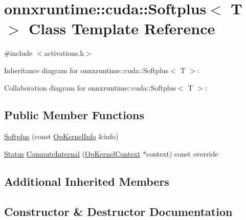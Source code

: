 \hypertarget{classonnxruntime_1_1cuda_1_1Softplus}{}\section{onnxruntime\+:\+:cuda\+:\+:Softplus$<$ T $>$ Class Template Reference}
\label{classonnxruntime_1_1cuda_1_1Softplus}


{\ttfamily \#include $<$activations.\+h$>$}



Inheritance diagram for onnxruntime\+:\+:cuda\+:\+:Softplus$<$ T $>$\+:


Collaboration diagram for onnxruntime\+:\+:cuda\+:\+:Softplus$<$ T $>$\+:
\subsection*{Public Member Functions}
\begin{DoxyCompactItemize}
\item 
\mbox{\hyperlink{classonnxruntime_1_1cuda_1_1Softplus_a73c8ec5cdf027ed7f70bb072b58ab3ea}{Softplus}} (const \mbox{\hyperlink{classonnxruntime_1_1OpKernelInfo}{Op\+Kernel\+Info}} \&info)
\item 
\mbox{\hyperlink{classonnxruntime_1_1common_1_1Status}{Status}} \mbox{\hyperlink{classonnxruntime_1_1cuda_1_1Softplus_a3ad8048f5c23f4edb87db9f86e419db8}{Compute\+Internal}} (\mbox{\hyperlink{classonnxruntime_1_1OpKernelContext}{Op\+Kernel\+Context}} $\ast$context) const override
\end{DoxyCompactItemize}
\subsection*{Additional Inherited Members}


\subsection{Constructor \& Destructor Documentation}
\mbox{\label{classonnxruntime_1_1cuda_1_1Softplus_a73c8ec5cdf027ed7f70bb072b58ab3ea}} 
